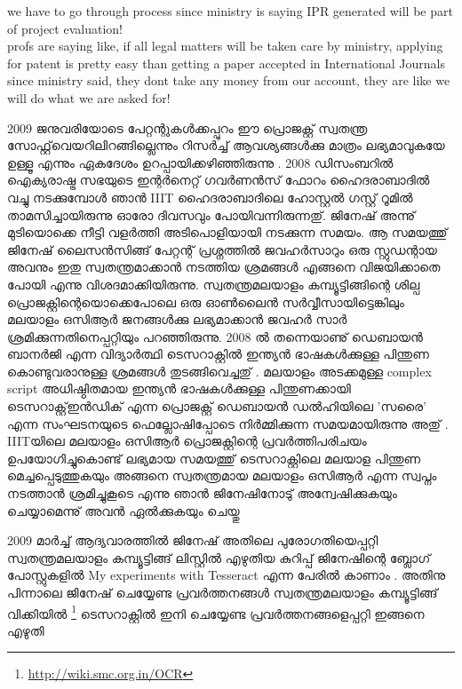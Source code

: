 \begin{english}
we have to go through process since ministry is saying IPR generated will be part of project evaluation!\\
profs are saying like, if all legal matters will be taken care by ministry, applying for patent is pretty easy than getting a paper accepted in International Journals\\
since ministry said, they dont take any money from our account, they are like we will do what we are asked for!
\end{english}

2009 ജനുവരിയോടെ പേറ്റന്റുകള്‍ക്കപ്പുറം ഈ പ്രൊജക്റ്റ് സ്വതന്ത്ര സോഫ്റ്റ്‌വെയറിലിറങ്ങില്ലെന്നും റിസര്‍ച്ച് ആവശ്യങ്ങള്‍ക്കു മാത്രം ലഭ്യമാവുകയേ ഉള്ളൂ എന്നും ഏകദേശം ഉറപ്പായിക്കഴിഞ്ഞിരുന്നു . 2008 ഡിസംബറില്‍  ഐക്യരാഷ്ട്ര സഭയുടെ ഇന്റര്‍നെറ്റ് ഗവര്‍ണന്‍സ് ഫോറം ഹൈദരാബാദില്‍ വച്ചു നടക്കുമ്പോള്‍ ഞാന്‍ IIIT ഹൈദരാബാദിലെ ഹോസ്റ്റല്‍ ഗസ്റ്റ് റൂമില്‍ താമസിച്ചായിരുന്നു  ഓരോ ദിവസവും പോയിവന്നിരുന്നതു്. ജിനേഷ് അന്നു് മുടിയൊക്കെ നീട്ടി വളര്‍ത്തി അടിപൊളിയായി നടക്കുന്ന സമയം. ആ സമയത്തു് ജിനേഷ് ലൈസന്‍സിങ്ങ് പേറ്റന്റ് പ്രശ്നത്തില്‍ ജവഹര്‍സാറും ഒരു സ്റ്റുഡന്റായ അവനും ഇതു സ്വതന്ത്രമാക്കാന്‍ നടത്തിയ ശ്രമങ്ങള്‍ എങ്ങനെ വിജയിക്കാതെ പോയി എന്നു വിശദമാക്കിയിരുന്നു. സ്വതന്ത്രമലയാളം കമ്പ്യൂട്ടിങ്ങിന്റെ ശില്പ പ്രൊജക്റ്റിന്റെയൊക്കെപോലെ ഒരു ഓണ്‍ലൈന്‍ സര്‍വ്വീസായിട്ടെങ്കിലും മലയാളം ഒസിആര്‍ ജനങ്ങള്‍ക്കു ലഭ്യമാക്കാന്‍ ജവഹര്‍ സാര്‍ ശ്രമിക്കുന്നതിനെപ്പറ്റിയും പറഞ്ഞിരുന്നു. 2008 ല്‍ തന്നെയാണു് ഡെബായന്‍ ബാനര്‍ജി എന്ന വിദ്യാര്‍ത്ഥി ടെസറാക്റ്റില്‍ ഇന്ത്യന്‍ ഭാഷകള്‍ക്കുള്ള പിന്തുണ കൊണ്ടുവരാനുള്ള ശ്രമങ്ങള്‍ തുടങ്ങിവെച്ചതു് . മലയാളം അടക്കമുള്ള complex script അധിഷ്ഠിതമായ ഇന്ത്യന്‍ ഭാഷകള്‍ക്കുള്ള പിന്തുണക്കായി ടെസറാക്റ്റ്ഇന്‍ഡിക് എന്ന പ്രൊജക്റ്റ് ഡെബായന്‍ ഡല്‍ഹിയിലെ 'സരൈ' എന്ന സംഘടനയുടെ ഫെല്ലോഷിപ്പോടെ നിര്‍മ്മിക്കുന്ന സമയമായിരുന്നു അതു് . IIITയിലെ മലയാളം ഒസിആര്‍ പ്രൊജക്റ്റിന്റെ പ്രവര്‍ത്തിപരിചയം ഉപയോഗിച്ചുകൊണ്ട് ലഭ്യമായ സമയത്തു് ടെസറാക്റ്റിലെ മലയാള പിന്തുണ മെച്ചപ്പെടുത്തുകയും അങ്ങനെ സ്വതന്ത്രമായ മലയാളം ഒസിആര്‍ എന്ന സ്വപ്നം നടത്താന്‍ ശ്രമിച്ചുകൂടെ എന്നു ഞാന്‍ ജിനേഷിനോടു് അന്വേഷിക്കുകയും  ചെയ്യാമെന്നു് അവന്‍ ഏല്‍ക്കുകയും ചെയ്തു 

2009 മാര്‍ച്ച് ആദ്യവാരത്തില്‍ ജിനേഷ് അതിലെ പുരോഗതിയെപ്പറ്റി സ്വതന്ത്രമലയാളം കമ്പ്യൂട്ടിങ്ങ് ലിസ്റ്റില്‍ എഴുതിയ കുറിപ്പ് ജിനേഷിന്റെ ബ്ലോഗ് പോസ്റ്റുകളില്‍  My experiments with Tesseract എന്ന പേരില്‍ കാണാം .
അതിനു പിന്നാലെ ജിനേഷ് ചെയ്യേണ്ട പ്രവര്‍ത്തനങ്ങള്‍ സ്വതന്ത്രമലയാളം കമ്പ്യൂട്ടിങ്ങ് വിക്കിയില്‍ \footnote{\url{http://wiki.smc.org.in/OCR}} ടെസറാക്റ്റില്‍ ഇനി ചെയ്യേണ്ട പ്രവര്‍ത്തനങ്ങളെപ്പറ്റി ഇങ്ങനെ എഴുതി 

